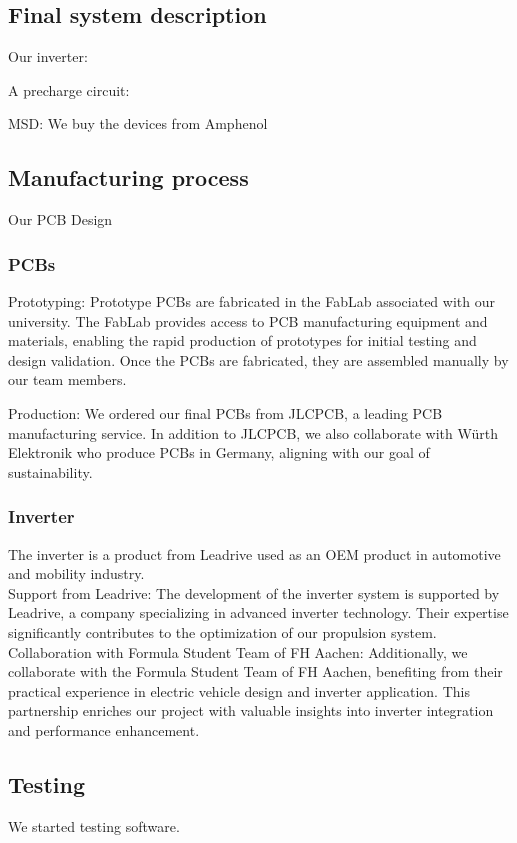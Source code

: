 \subsection{Final system description}
Our inverter:


A precharge circuit:

MSD: We buy the devices from Amphenol







\subsection{Manufacturing process}
Our PCB Design
\subsubsection{PCBs}
\par Prototyping: Prototype PCBs are fabricated in the FabLab associated with our university. The FabLab provides access to PCB manufacturing equipment and materials, enabling the rapid production of prototypes for initial testing and design validation.
    Once the PCBs are fabricated, they are assembled manually by our team members. 
\par Production: We ordered our final PCBs from JLCPCB, a leading PCB manufacturing service. In addition to JLCPCB, we also collaborate with Würth Elektronik who produce 
PCBs in Germany, aligning with our goal of sustainability.

\subsubsection{Inverter}
The inverter is a product from Leadrive used as an OEM product in automotive and mobility industry. \\

    Support from Leadrive: The development of the inverter system is supported by Leadrive, a company specializing in advanced inverter technology. Their expertise significantly contributes to the optimization of our propulsion system.
    Collaboration with Formula Student Team of FH Aachen: Additionally, we collaborate with the Formula Student Team of FH Aachen, benefiting from their practical experience in electric vehicle design and inverter application. This partnership enriches our project with valuable insights into inverter integration and performance enhancement.

\subsection{Testing}
We started testing software.

